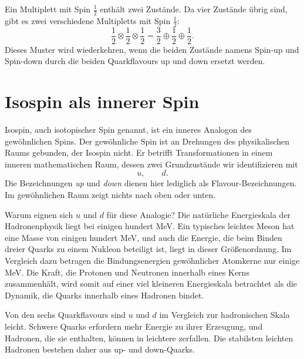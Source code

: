 Ein Multiplett mit Spin \(\tfrac12\) enthält zwei Zustände. Da vier Zustände übrig sind, gibt es zwei verschiedene Multipletts mit Spin \(\tfrac12\):
\begin{equation}
\frac12\otimes\frac12\otimes\frac12
=
\frac32\oplus\frac12\oplus\frac12.
\end{equation}
Dieses Muster wird wiederkehren, wenn die beiden Zustände namens Spin-up und Spin-down durch die beiden Quarkflavours up und down ersetzt werden.

\section{Isospin als innerer Spin}

Isospin, auch isotopischer Spin genannt, ist ein inneres Analogon des gewöhnlichen Spins. Der gewöhnliche Spin ist an Drehungen des physikalischen Raums gebunden, der Isospin nicht. Er betrifft Transformationen in einem inneren mathematischen Raum, dessen zwei Grundzustände wir identifizieren mit
\begin{equation}
u,\qquad d.
\end{equation}
Die Bezeichnungen \emph{up} und \emph{down} dienen hier lediglich als Flavour-Bezeichnungen. Im gewöhnlichen Raum zeigt nichts nach oben oder unten.


Warum eignen sich \(u\) und \(d\) für diese Analogie? Die natürliche Energieskala der Hadronenphysik liegt bei einigen hundert MeV. Ein typisches leichtes Meson hat eine Masse von einigen hundert MeV, und auch die Energie, die beim Binden dreier Quarks zu einem Nukleon beteiligt ist, liegt in dieser Größenordnung. Im Vergleich dazu betragen die Bindungsenergien gewöhnlicher Atomkerne nur einige MeV. Die Kraft, die Protonen und Neutronen innerhalb eines Kerns zusammenhält, wird somit auf einer viel kleineren Energieskala betrachtet als die Dynamik, die Quarks innerhalb eines Hadronen bindet.

Von den sechs Quarkflavours sind \(u\) und \(d\) im Vergleich zur hadronischen Skala leicht. Schwere Quarks erfordern mehr Energie zu ihrer Erzeugung, und Hadronen, die sie enthalten, können in leichtere zerfallen. Die stabilsten leichten Hadronen bestehen daher aus up- und down-Quarks.

